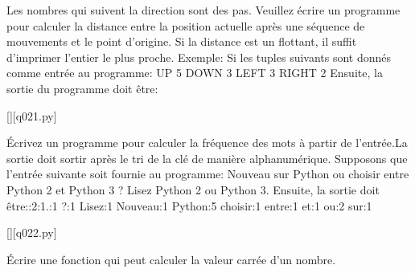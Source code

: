 Les nombres qui suivent la direction sont des pas.\newline
Veuillez écrire un programme pour calculer la distance entre la position actuelle après une séquence de mouvements et le point d'origine. Si la distance est un flottant, il suffit d'imprimer l'entier le plus proche.\newline
Exemple:\newline
Si les tuples suivants sont donnés comme entrée au programme:
UP 5\newline
DOWN 3\newline
LEFT 3\newline
RIGHT 2\newline
Ensuite, la sortie du programme doit être:

\renewcommand{\nomfichier}{q021.py}
\begin{solution}
    \pythonfile{\chemincode \nomfichier}[][\nomfichier]
\end{solution}

\question
Écrivez un programme pour calculer la fréquence des mots à partir de l'entrée.La sortie doit sortir après le tri de la clé de manière alphanumérique.\newline
Supposons que l'entrée suivante soit fournie au programme:\newline
Nouveau sur Python ou choisir entre Python 2 et Python 3 ? Lisez Python 2 ou Python 3.\newline
Ensuite, la sortie doit être::2:1.:1\newline
?:1\newline
Lisez:1\newline
Nouveau:1\newline
Python:5\newline
choisir:1\newline
entre:1\newline
et:1\newline
ou:2\newline
sur:1

\renewcommand{\nomfichier}{q022.py}
\begin{solution}
    \pythonfile{\chemincode \nomfichier}[][\nomfichier]
\end{solution}

\question
Écrire une fonction qui peut calculer la valeur carrée d'un nombre.

